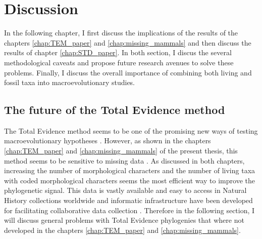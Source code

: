 \chapter{Discussion}
\label{chap:discussion}

%
% 

In the following chapter, I first discuss the implications of the results of the chapters \ref{chap:TEM_paper} and \ref{chap:missing_mammals} and then discuss the results of chapter \ref{chap:STD_paper}.
In both section, I discus the several methodological caveats and propose future research avenues to solve these problems.
Finally, I discuss the overall importance of combining both living and fossil taxa into macroevolutionary studies.

\section{The future of the Total Evidence method}
The Total Evidence method seems to be one of the promising new ways of testing macroevolutionary hypotheses \citep[e.g.][]{ronquista2012,slaterphylogenetic2013,Wood01032013,beckancient2014,Dembo2015}.
However, as shown in the chapters \ref{chap:TEM_paper} and \ref{chap:missing_mammals} of the present thesis, this method seems to be sensitive to missing data \citep{GuillermeCooper,MissingMammals}.
As discussed in both chapters, increasing the number of morphological characters and the number of living taxa with coded morphological characters seems the most efficient way to improve the phylogenetic signal.
This data is vastly available and easy to access in Natural History collections worldwide and informatic infrastructure have been developed for facilitating collaborative data collection \citep{morphobank}.
Therefore in the following section, I will discuss general problems with Total Evidence phylogenies that where not developed in the chapters \ref{chap:TEM_paper} and \ref{chap:missing_mammals}. 

